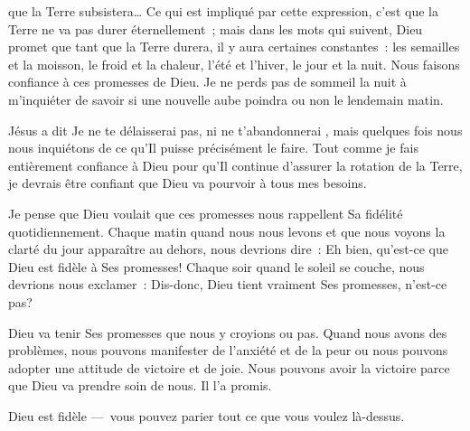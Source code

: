  que la Terre subsistera\dots{} \fg{} Ce qui est
 impliqué par cette expression, c'est que la Terre ne va pas durer éternellement~;
 mais dans les mots qui suivent, Dieu promet que tant que la Terre durera, il y
 aura certaines constantes~: les semailles et la moisson, le froid et la chaleur,
 l'été et l'hiver, le jour et la nuit. Nous faisons confiance à ces promesses de
 Dieu. Je ne perds pas de sommeil la nuit à m'inquiéter de savoir si une nouvelle
 aube poindra ou non le lendemain matin. 


Jésus a dit \og Je ne te délaisserai pas, ni ne t'abandonnerai \fg{}, mais
 quelques fois nous nous inquiétons de ce qu'Il puisse précisément le faire.
 Tout comme je fais entièrement confiance à Dieu pour qu'Il continue d'assurer
 la rotation de la Terre, je devrais être confiant que Dieu va pourvoir à tous
 mes besoins.

Je pense que Dieu voulait que ces promesses nous rappellent Sa fidélité
 quotidiennement. Chaque matin quand nous nous levons et que nous voyons la
 clarté du jour apparaître au dehors, nous devrions dire~: \og Eh bien, qu'est-ce
 que Dieu est fidèle à Ses promesses! \fg{} Chaque soir quand le soleil se
 couche, nous devrions nous exclamer~: \og Dis-donc, Dieu tient vraiment Ses
 promesses, n'est-ce pas? \fg{}

Dieu va tenir Ses promesses que nous y croyions ou pas. Quand nous avons des
 problèmes, nous pouvons manifester de l'anxiété et de la peur ou nous pouvons
 adopter une attitude de victoire et de joie. Nous pouvons avoir la victoire
 parce que Dieu va prendre soin de nous. Il l'a promis.

Dieu est fidèle ---~vous pouvez parier tout ce que vous voulez là-dessus. 

\dvrule






